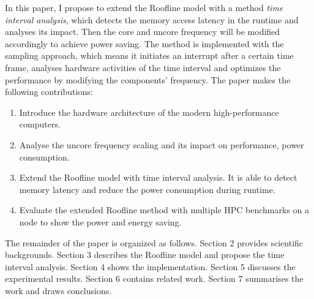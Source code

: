 In this paper, I propose to extend the Roofline model with a method \textit{time interval analysis}, which detects the memory access latency in the runtime and analyses its impact. Then the core and uncore frequency will be modified accordingly to achieve power saving. The method is implemented with the sampling approach, which means it initiates an interrupt after a certain time frame, analyses hardware activities of the time interval and optimizes the performance by modifying the components' frequency. The paper makes the following contributions:
\begin{enumerate}
\item Introduce the hardware architecture of the modern high-performance computers.
\item Analyse the uncore frequency scaling and its impact on performance, power consumption.
\item Extend the Roofline model with time interval analysis. It is able to detect memory latency and reduce the power consumption during runtime. 
\item Evaluate the extended Roofline method with multiple HPC benchmarks on a node to show the power and energy saving.
\end{enumerate}

The remainder of the paper is organized as follows. Section 2 provides scientific backgrounds. Section 3 describes the Roofline model and propose the time interval analysis. Section 4 shows the implementation. Section 5 discusses the experimental results. Section 6 contains related work. Section 7 summarises the work and draws conclusions.
